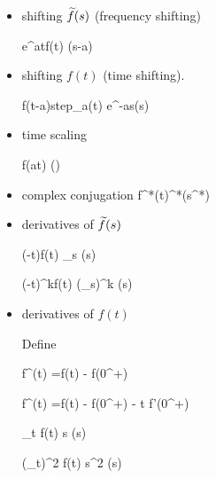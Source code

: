 \begin{itemize}
A common question
is how does one 
evaluate
convolutions in practice.
If one can sample and remember
the waveforms $f(\tau)$
and $g(\tau)$
for all $\tau\in[0,t]$,
then it's just a matter 
of multiplication
and addition of samples.
Sometimes, even if we
have no memory resources,
it's possible to calculate a convolution. For example,
if $g(t)=e^{st}step_0(t)$

\beqa
(f\circledast g)(t)
&=&
\int_0^t d\tau\;
f(\tau)e^{s(t-\tau)}
\\
&=&
_
{g(t)}(s)
\eeqa
so convolving this $g(\cdot)$
merely evaluates it at $t$
and multiplies it
by a constant $\TIL{f}(s)$.



\item shifting $\TIL{f}(s)$ (frequency shifting)



\beq
e^{at}f(t)\maparrow{\call} (s-a)
\quad{}
\eeq



\item shifting $f(t)$ (time shifting).



\beq
f(t-a)\;step_a(t)\maparrow{\call}
e^{-as}(s)
\quad{}
\eeq

\item time scaling

\beq
f(at)
\maparrow{\call}
\left(\right)
\quad{}
\eeq


\item complex 
conjugation
\beq
f^*(t)\maparrow{\call}^*(s^*)
\eeq

\item
derivatives of $\TIL{f}(s)$

\beq
(-t)f(t)
\maparrow{\call}
 \partial_s
(s)
\eeq

\beq
(-t)^kf(t)
\maparrow{\call} (\partial_s)^k
(s)
\eeq

\item
derivatives of $f(t)$

Define

\beq
f^{}(t)
=f(t) - 
f(0^+)
\eeq


\beq
f^{}(t)
=f(t) - 
f(0^+) - t f'(0^+)
\eeq

\beq
\partial_t f(t)
\maparrow{\call}
s
(s)
\eeq


\beq
(\partial_t)^2 f(t)
\maparrow{\call}
s^2
(s)
\eeq


\end{itemize}
